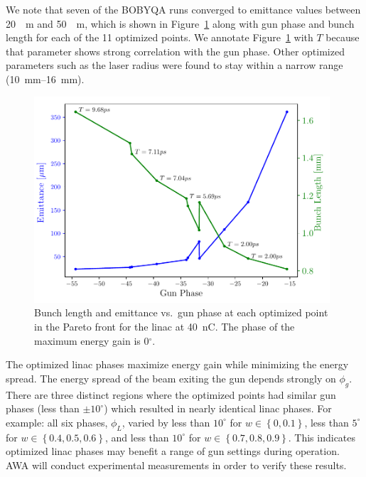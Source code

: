 \documentclass{iitthesis}
\begin{document}
We note that seven of the BOBYQA runs converged to emittance values
between \SI{20}{\mu m} and \SI{50}{\mu m}, which is shown in Figure~\ref{fig:trade} 
along with gun phase and bunch length for each of the 11
optimized points. We annotate Figure~\ref{fig:trade} with $T$ because that parameter 
shows strong correlation with the gun phase. Other optimized parameters such as the laser radius were found to stay within a 
narrow range (\SIrange{10}{16}{mm}).  
\begin{figure}[h]
	\captionsetup{width=0.98\linewidth}
	\begin{center}
		\includegraphics[width=0.98\textwidth]{images/THPAB155f3}
		\caption{\label{fig:trade}Bunch length and emittance vs.~gun phase at each optimized point in the Pareto front for the linac at \SI{40}{nC}. The phase of the maximum energy gain is 0$^{\circ}$.}
	\end{center}
\end{figure}


The optimized linac phases maximize energy gain while minimizing the energy spread.
The energy spread of the beam exiting the gun depends strongly on $\phi_g$.
There are three distinct regions where the optimized points had similar gun phases 
(less than $\pm10^{\circ}$) which resulted in nearly identical linac phases. For example:  
all six phases, $\phi_L$, varied by less than $10^{\circ}$ for $w \in \left\{ 0, 0.1\right\}$,
less than $5^{\circ}$ for $w \in \left\{ 0.4, 0.5, 0.6\right\}$, 
and less than $10^{\circ}$ for $w \in \left\{ 0.7, 0.8, 0.9\right\}$.
This indicates optimized linac phases may benefit a range of gun settings during operation. 
AWA will conduct experimental measurements in order to verify these results.
\end{document}
